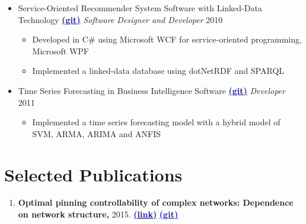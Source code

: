 \documentclass[letter]{res}
\begin{document}
\begin{resume}
\begin{itemize}[leftmargin=-.1in]
\item Service-Oriented Recommender System Software with Linked-Data Technology {\href{https://github.com/omid55/service_oriented_linked_data_based_recommender_system}{\textbf{\textcolor{blue}{(git)}}}}
\newline
{\sl Software Designer and Developer} \hfill 2010\\
   \vspace{-4mm}
   \iflong
     \begin{itemize}
        \item Developed in C\# using Microsoft WCF for service-oriented programming, Microsoft WPF
        \item Implemented a linked-data database using dotNetRDF and SPARQL
     \end{itemize}
   \fi

\item Time Series Forecasting in Business Intelligence Software {\href{https://github.com/omid55/time_series_forecasting_business_intelligence}{\textbf{\textcolor{blue}{(git)}}}}
\newline
{\sl Developer} \hfill 2011\\
   \vspace{-4mm}
   \iflong
     \begin{itemize}
        \item Implemented a time series forecasting model with a hybrid model of SVM, ARMA, ARIMA and ANFIS
     \end{itemize}
   \fi
   
\end{itemize}


\section{Selected Publications}
\begin{enumerate}[leftmargin=-.01in]
\item \textbf{Optimal pinning controllability of complex networks: Dependence on network structure,} 2015.
\href{http://link.aps.org/doi/10.1103/PhysRevE.91.012803}{\textbf{\textcolor{blue}{(link)}}}
{\href{https://github.com/omid55/optimal_pinning_control}{\textbf{\textcolor{blue}{(git)}}}}


\end{enumerate}
\end{resume}
\end{document}
